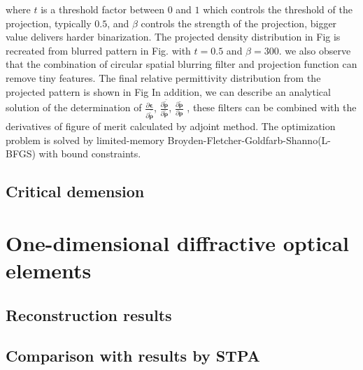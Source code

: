 where $t$ is a threshold factor between $0$ and $1$ which controls the threshold of the projection, typically $0.5$, and $\beta$ controls the strength of the projection, bigger value delivers harder binarization.
The projected density distribution in Fig is recreated from blurred pattern in Fig.
with $t=0.5$ and $\beta= 300$.
we also observe that the combination of circular spatial blurring filter and projection function can remove tiny features.
The final relative permittivity distribution from the projected pattern is shown in Fig
In addition, we can describe an analytical solution of the determination of $\frac{\partial \bm{\epsilon}}{\partial \bm{\bar{\tilde{\rho}}}}$, $\frac{\partial \bm{\bar{\tilde{\rho}}}}{\partial \bm{\tilde{\rho}}}$, $\frac{\partial \bm{\tilde{\rho}}}{\partial \bm{{\rho}}}$ \cite{Wang2011}, these filters can be combined with the derivatives of figure of merit calculated by adjoint method.
The optimization problem is solved by limited-memory Broyden-Fletcher-Goldfarb-Shanno(L-BFGS) with bound constraints.
\subsection{Critical demension}
\section{One-dimensional diffractive optical elements}
\subsection{Reconstruction results}
\subsection{Comparison with results by STPA}
